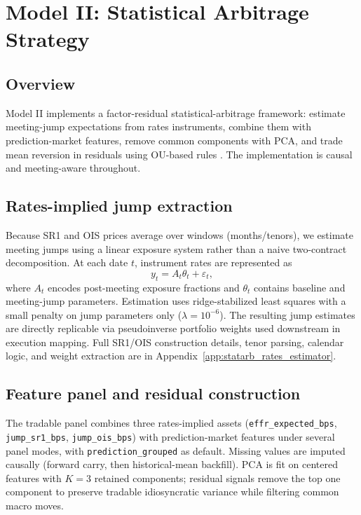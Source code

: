 
\section{Model II: Statistical Arbitrage Strategy}

\subsection{Overview}

Model II implements a factor-residual statistical-arbitrage framework: estimate meeting-jump expectations from rates instruments, combine them with prediction-market features, remove common components with PCA, and trade mean reversion in residuals using OU-based rules \cite{avellaneda2010statarb}. The implementation is causal and meeting-aware throughout.

\subsection{Rates-implied jump extraction}

Because SR1 and OIS prices average over windows (months/tenors), we estimate meeting jumps using a linear exposure system rather than a naive two-contract decomposition. At each date $t$, instrument rates are represented as
\[
y_t = A_t \theta_t + \varepsilon_t,
\]
where $A_t$ encodes post-meeting exposure fractions and $\theta_t$ contains baseline and meeting-jump parameters. Estimation uses ridge-stabilized least squares with a small penalty on jump parameters only ($\lambda=10^{-6}$). The resulting jump estimates are directly replicable via pseudoinverse portfolio weights used downstream in execution mapping. Full SR1/OIS construction details, tenor parsing, calendar logic, and weight extraction are in Appendix~\ref{app:statarb_rates_estimator}.

\subsection{Feature panel and residual construction}

The tradable panel combines three rates-implied assets (\texttt{effr\_expected\_bps}, \texttt{jump\_sr1\_bps}, \texttt{jump\_ois\_bps}) with prediction-market features under several panel modes, with \texttt{prediction\_grouped} as default. Missing values are imputed causally (forward carry, then historical-mean backfill). PCA is fit on centered features with $K=3$ retained components; residual signals remove the top one component to preserve tradable idiosyncratic variance while filtering common macro moves.

